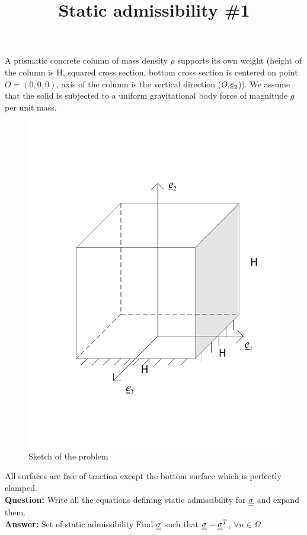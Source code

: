 \documentclass[letter,12pt]{article}
\begin{document}
\pagestyle{fancy}

\title{\textbf{Static admissibility \#1}}
\date{}

\maketitle

\vspace{-1cm}


A prismatic concrete column of mass density $\rho$ supports its own weight (height of the column is H, squared cross section, bottom cross section is centered on point $O=(0,0,0)$, axis of the column is the vertical direction ($O$,$\underline{e}_2$)).  We assume that the solid is subjected to a uniform gravitational body force of magnitude $g$ per unit mass. 

%
\begin{figure}[!h]
	\centering
	\includegraphics[width=0.5\linewidth]{./cube}
	\caption{Sketch of the problem}
\end{figure}
%

All surfaces are free of traction except the bottom surface which is perfectly clamped. \\

\noindent \textbf{Question:} Write all the equations defining static admissibility  for $\underline{\underline{\sigma}}$ and expand them.\\

\noindent \textbf{Answer:} Set of static admissibility
Find $\underline{\underline{\sigma}} $ such that $ \underline{\underline{\sigma}} =\underline{\underline{\sigma}}^T $,  $\forall n \in \Omega$ \\
\end{document}
